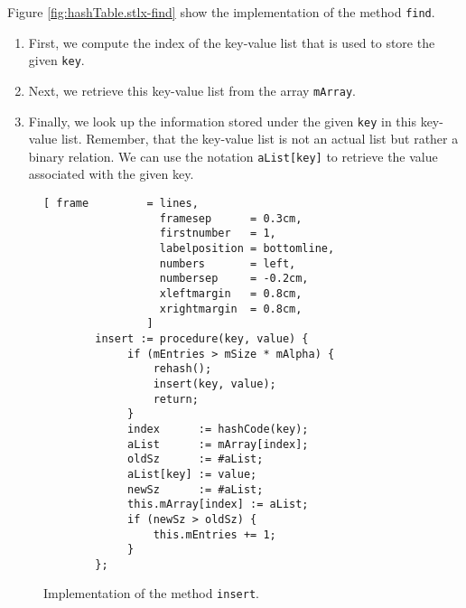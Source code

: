 Figure \ref{fig:hashTable.stlx-find} show the implementation of the method \texttt{find}.
\begin{enumerate}
\item First, we compute the index of the key-value list that is used to store the given
      \texttt{key}.
\item Next, we retrieve this key-value list from the array \texttt{mArray}.
\item Finally, we look up the information stored under the given \texttt{key} in this 
      key-value list.  Remember, that the key-value list is not an actual list but rather a binary
      relation.  We can use the notation \texttt{aList[key]} to retrieve the value associated with
      the given key.
\end{enumerate}

\begin{figure}[!ht]
\centering
\begin{Verbatim}[ frame         = lines, 
                  framesep      = 0.3cm, 
                  firstnumber   = 1,
                  labelposition = bottomline,
                  numbers       = left,
                  numbersep     = -0.2cm,
                  xleftmargin   = 0.8cm,
                  xrightmargin  = 0.8cm,
                ]
        insert := procedure(key, value) {
             if (mEntries > mSize * mAlpha) {
                 rehash();
                 insert(key, value);
                 return;
             }
             index      := hashCode(key);
             aList      := mArray[index];
             oldSz      := #aList;
             aList[key] := value;
             newSz      := #aList;
             this.mArray[index] := aList;
             if (newSz > oldSz) {
                 this.mEntries += 1;
             }    
        };
\end{Verbatim}
\vspace*{-0.3cm}
\caption{Implementation of the method \texttt{insert}.}
\label{fig:hashTable.stlx-insert}
\end{figure}

